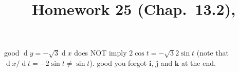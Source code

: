 \documentclass[10pt]{article} %
\title{Homework 25 (Chap.~13.2),
}
\newcommand{\dd}[1]{\operatorname{d}#1}
\begin{document}
\maketitle
{}
good
$\dd y = -\sqrt{3}\dd x$ does NOT imply $2\cos t=-\sqrt{3}2\sin t$ (note that $\dd x/\dd t=-2\sin t\neq \sin t$).
good
you forgot $\mathbf{i}$, $\mathbf{j}$ and $\mathbf{k}$ at the end.
\end{document}
